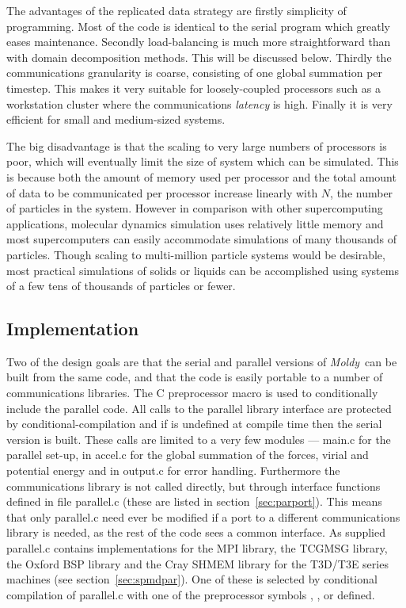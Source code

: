\documentclass[a4paper,twoside]{report}
\newcommand{\Fname}[1]{{\upshape\mdseries\sffamily#1}}
\newcommand{\moldy}{\emph{Moldy}}
\begin{document}
The advantages of the replicated data strategy are firstly simplicity
of programming.  Most of the code is identical to the serial program
which greatly eases maintenance.  Secondly load-balancing is much more
straightforward than with domain decomposition methods.  This will be
discussed below.  Thirdly the communications granularity is coarse,
consisting of one global summation per timestep.  This makes it very
suitable for loosely-coupled processors such as a workstation cluster
where the communications \emph{latency} is high.  Finally it is very
efficient for small and medium-sized systems.

The big disadvantage is that the scaling to very large numbers of
processors is poor, which will eventually limit the size of system
which can be simulated.  This is because both the amount of memory
used per processor and the total amount of data to be communicated per
processor increase linearly with $N$, the number of particles in the
system.  However in comparison with other supercomputing applications,
molecular dynamics simulation uses relatively little memory and most
supercomputers can easily accommodate simulations of many thousands of
particles.  Though scaling to multi-million particle systems
would be desirable, most practical simulations of solids or liquids
can be accomplished using systems of a few tens of thousands of
particles or fewer.

\subsection{Implementation}

Two of the design goals are that the serial and parallel versions of
\moldy\ can be built from the same code, and that the code is easily
portable to a number of communications libraries.  The C preprocessor
macro  is used to conditionally include the parallel
code. All calls to the parallel library interface are protected by
conditional-compilation and if  is undefined at compile
time then the serial version is built.  These calls are limited to a
very few modules --- \Fname{main.c} for the parallel set-up,
 in \Fname{accel.c} for the global summation of the
forces, virial and potential energy and  in
\Fname{output.c} for error handling.  Furthermore the communications
library is not called directly, but through interface functions
defined in file \Fname{parallel.c} (these are listed in
section~\ref{sec:parport}).  This means that only \Fname{parallel.c} need
ever be modified if a port to a different communications library is
needed, as the rest of the code sees a common interface.  As supplied
\Fname{parallel.c} contains implementations for the MPI library, the
TCGMSG library, the Oxford BSP library and the Cray SHMEM library for
the T3D/T3E series machines (see section~\ref{sec:spmdpar}).  One of
these is selected by conditional compilation of \Fname{parallel.c} with
one of the preprocessor symbols , ,
 or  defined.
\end{document}
